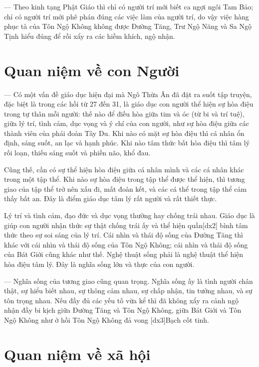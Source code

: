 — Theo kinh tạng Phật Giáo thì chỉ có người trí mới biết ca ngợi ngôi Tam Bảo; chỉ có người trí mới phê phán đúng các việc làm của người trí, do vậy việc hàng phục tà của Tôn Ngộ Không không được Đường Tăng, Trư Ngộ Năng và Sa Ngộ Tịnh hiểu đúng để rồi xẩy ra các hiềm khích, ngộ nhận.

\section{Quan niệm về con Người} %
\label{sec:27_28_con_nguoi}

— Có một vấn đề giáo dục hiện đại mà Ngô Thừa Ân đã đặt ra suốt tập truyện, đặc biệt là trong các hồi từ 27 đến 31, là giáo dục con người thể hiện sự hòa điệu trong tự thân mỗi người: thế nào để điều hòa giữa tim và óc (từ bi và trí tuệ), giữa lý trí, tình cảm, dục vọng và ý chí của con người, như sự hòa điệu giữa các thành viên của phái đoàn Tây Du. Khi nào có mặt sự hòa điệu thì cá nhân ổn định, sáng suốt, an lạc và hạnh phúc. Khi nào tâm thức bất hòa điệu thì tâm lý rối loạn, thiếu sáng suốt và phiền não, khổ đau.

Cũng thế, cần có sự thể hiện hòa điệu giữa cá nhân mình và các cá nhân khác trong một tập thể. Khi nào sự hòa điệu trong tập thể được thể hiện, thì tương giao của tập thể trở nên xấu đi, mất đoàn kết, và các cá thể trong tập thể cảm thấy bất an. Đây là điểm giáo dục tâm lý rất người và rất thiết thực.

Lý trí và tình cảm, đạo đức và dục vọng thường hay chống trái nhau. Giáo dục là giúp con người nhận thức sự thật chống trái ấy và thể hiện quần[dx2] bình tâm thức theo sự soi sáng của lý trí. Cái nhìn và thái độ sống của Đường Tăng thì khác với cái nhìn và thái độ sống của Tôn Ngộ Không; cái nhìn và thái độ sống của Bát Giới cũng khác như thế. Nghệ thuật sống phải là nghệ thuật thể hiện hòa điệu tâm lý. Đây là nghĩa sống lớn và thực của con người.

— Nghĩa sống của tương giao cũng quan trọng. Nghĩa sống ấy là tình người chân thật, sự hiểu biết nhau, sự thông cảm nhau, sự chấp nhận, tin tưởng nhau, và sự tôn trọng nhau. Nếu đầy đủ các yếu tố vừa kể thì đã không xẩy ra cảnh ngộ nhận đầy bi kịch giữa Đường Tăng và Tôn Ngộ Không, giữa Bát Giới và Tôn Ngộ Không như ở hồi Tôn Ngộ Không đả vong [dx3]Bạch cốt tinh.

\section{Quan niệm về xã hội} %
\label{sec:27_28_xa_hoi}

